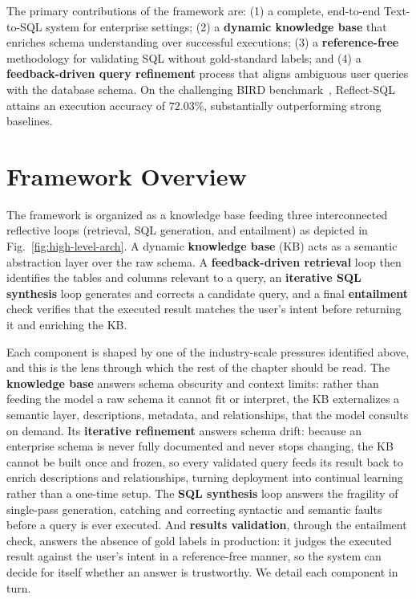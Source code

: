 The primary contributions of the framework are: (1) a complete, end-to-end Text-to-SQL system for enterprise settings; (2) a \textbf{dynamic knowledge base} that enriches schema understanding over successful executions; (3) a \textbf{reference-free} methodology for validating SQL without gold-standard labels; and (4) a \textbf{feedback-driven query refinement} process that aligns ambiguous user queries with the database schema. On the challenging BIRD benchmark~\cite{li2023bird}, Reflect-SQL attains an execution accuracy of $72.03\%$, substantially outperforming strong baselines.

\section{Framework Overview}
The framework is organized as a knowledge base feeding three interconnected reflective loops (retrieval, SQL generation, and entailment) as depicted in Fig.~\ref{fig:high-level-arch}. A dynamic \textbf{knowledge base} (KB) acts as a semantic abstraction layer over the raw schema. A \textbf{feedback-driven retrieval} loop then identifies the tables and columns relevant to a query, an \textbf{iterative SQL synthesis} loop generates and corrects a candidate query, and a final \textbf{entailment} check verifies that the executed result matches the user's intent before returning it and enriching the KB.

Each component is shaped by one of the industry-scale pressures identified above, and this is the lens through which the rest of the chapter should be read. The \textbf{knowledge base} answers schema obscurity and context limits: rather than feeding the model a raw schema it cannot fit or interpret, the KB externalizes a semantic layer, descriptions, metadata, and relationships, that the model consults on demand. Its \textbf{iterative refinement} answers schema drift: because an enterprise schema is never fully documented and never stops changing, the KB cannot be built once and frozen, so every validated query feeds its result back to enrich descriptions and relationships, turning deployment into continual learning rather than a one-time setup. The \textbf{SQL synthesis} loop answers the fragility of single-pass generation, catching and correcting syntactic and semantic faults before a query is ever executed. And \textbf{results validation}, through the entailment check, answers the absence of gold labels in production: it judges the executed result against the user's intent in a reference-free manner, so the system can decide for itself whether an answer is trustworthy. We detail each component in turn.

